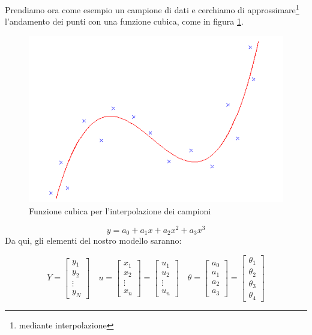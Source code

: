 \begin{esempio} %
Prendiamo ora come esempio un campione di dati e cerchiamo di approssimare\footnote{mediante interpolazione} l'andamento dei punti con una funzione cubica, come in figura \ref{fig:andamentocubido}.

  \begin{figure}[htbp]
    \centering
    \includegraphics[scale=0.5]{img/cubica.png}
    \caption{Funzione cubica per l'interpolazione dei campioni\label{fig:andamentocubido}}
  \end{figure}

  \[ y=a_0 + a_1x+a_2x^2+a_3x^3 \]
Da qui, gli elementi del nostro modello saranno:

  \[
    Y=\begin{bmatrix} y_1\\y_2\\ \vdots \\ y_N \end{bmatrix}\quad
    u=\begin{bmatrix} x_1 \\ x_2 \\ \vdots \\ x_n \end{bmatrix}=\begin{bmatrix} u_1 \\ u_2 \\ \vdots \\u_n \end{bmatrix}\quad
    \theta=\begin{bmatrix} a_0 \\ a_1 \\ a_2 \\ a_3 \end{bmatrix}=\begin{bmatrix} \theta_1 \\ \theta_2 \\ \theta_3 \\ \theta_4 \end{bmatrix}
  \]
  

\end{esempio}
